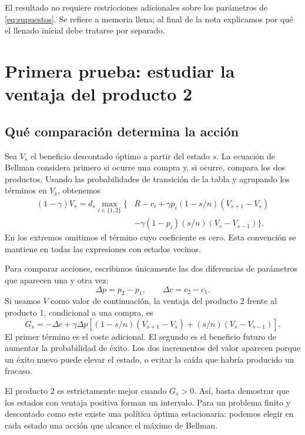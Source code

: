 \documentclass[11pt,a4paper]{article}
\begin{document}
El resultado no requiere restricciones adicionales sobre los parámetros
de \eqref{eq:supuestos}. Se refiere a memoria llena; al final de la
nota explicamos por qué el llenado inicial debe tratarse por separado.

\section{Primera prueba: estudiar la ventaja del producto 2}
\label{sec:primera}

\subsection{Qué comparación determina la acción}

Sea $V_s$ el beneficio descontado óptimo a partir del estado $s$.
La ecuación de Bellman considera primero si ocurre una compra y,
si ocurre, compara los dos productos. Usando las probabilidades de
transición de la tabla y agrupando los términos en $V_s$, obtenemos
\begin{equation}
\begin{aligned}
(1-\gamma)V_s=d_s\max_{i\in\{1,2\}}\biggl\{
&R-c_i+\gamma p_i(1-s/n)(V_{s+1}-V_s)\\
&-\gamma(1-p_i)(s/n)(V_s-V_{s-1})\biggr\}.
\end{aligned}
\label{eq:bellman}
\end{equation}
En los extremos omitimos el término cuyo coeficiente es cero. Esta
convención se mantiene en todas las expresiones con estados vecinos.

Para comparar acciones, escribimos únicamente las dos diferencias
de parámetros que aparecen una y otra vez:
\[
\Delta p=p_2-p_1,\qquad \Delta c=c_2-c_1.
\]
Si usamos $V$ como valor de continuación, la ventaja del producto 2
frente al producto 1, condicional a una compra, es
\begin{equation}
G_s=-\Delta c+\gamma\Delta p
\left[(1-s/n)(V_{s+1}-V_s)+(s/n)(V_s-V_{s-1})\right].
\label{eq:advantage}
\end{equation}
El primer término es el coste adicional. El segundo es el beneficio
futuro de aumentar la probabilidad de éxito. Los dos incrementos del
valor aparecen porque un éxito nuevo puede elevar el estado, o evitar
la caída que habría producido un fracaso.

El producto 2 es estrictamente mejor cuando $G_s>0$. Así, basta
demostrar que los estados con ventaja positiva forman un intervalo.
Para un problema finito y descontado como este existe una política
óptima estacionaria: podemos elegir en cada estado una acción que
alcance el máximo de Bellman.
\end{document}
